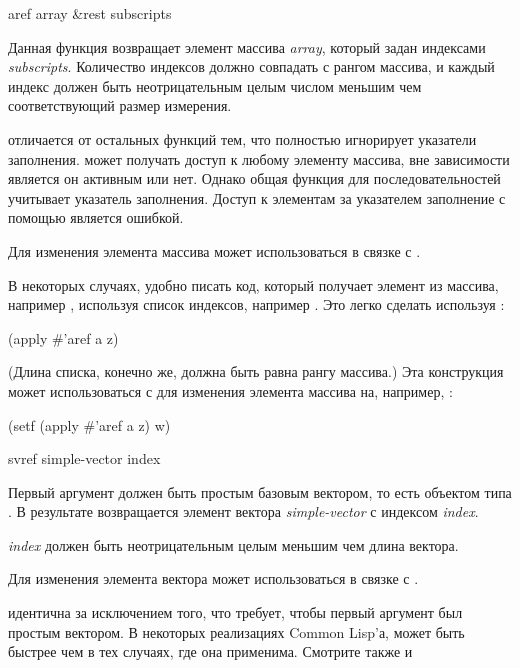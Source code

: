 \begin{defun}[Функция]
aref array &rest subscripts

Данная функция возвращает элемент массива \emph{array}, который задан индексами
\emph{subscripts}. Количество индексов должно совпадать с рангом массива, и
каждый индекс должен быть неотрицательным целым числом меньшим чем
соответствующий размер измерения.

 отличается от остальных функций тем, что полностью игнорирует
указатели заполнения.
 может получать доступ к любому элементу массива, вне зависимости
является он активным или нет. Однако общая функция для последовательностей
 учитывает указатель заполнения. Доступ к элементам за указателем
заполнение с помощью  является ошибкой.

Для изменения элемента массива может использоваться  в связке с
.

В некоторых случаях, удобно писать код, который получает элемент из массива,
например , используя список индексов, например .
Это легко сделать используя :
\begin{lisp}
(apply \#'aref a z)
\end{lisp}
(Длина списка, конечно же, должна быть равна рангу массива.) Эта конструкция
может использоваться с  для изменения элемента массива на, например,
:
\begin{lisp}
(setf (apply \#'aref a z) w)
\end{lisp}
\end{defun}

\begin{defun}[Функция]
svref simple-vector index

Первый аргумент должен быть простым базовым вектором, то есть объектом типа
.
В результате возвращается элемент вектора \emph{simple-vector} с индексом
\emph{index}.

\emph{index} должен быть неотрицательным целым меньшим чем длина вектора.

Для изменения элемента вектора может использоваться  в связке с
.

 идентична  за исключением того, что требует, чтобы первый
аргумент был простым вектором. В некоторых реализациях Common Lisp'а,
 может быть быстрее чем  в
тех случаях, где она применима.
Смотрите также  и 
\end{defun}

